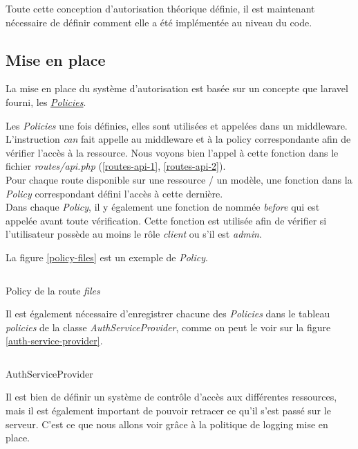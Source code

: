 \documentclass[
    iai, %
    il, %
]{heig-tb}
\begin{document}
Toute cette conception d'autorisation théorique définie, il est maintenant nécessaire de définir comment elle a été implémentée au niveau du code.

\subsection{Mise en place}
La mise en place du système d'autorisation est basée sur un concepte que \Gls{laravel} fourni, les \href{https://laravel.com/docs/9.x/authorization#creating-policies}{\emph{Policies}}.

Les \emph{Policies} une fois définies, elles sont utilisées et appelées dans un middleware. L'instruction \emph{can} fait appelle au middleware et à la policy correspondante afin de vérifier l'accès à la ressource. Nous voyons bien l'appel à cette fonction dans le fichier \emph{routes/api.php} (\ref{routes-api-1}, \ref{routes-api-2}). \\
Pour chaque route disponible sur une ressource / un modèle, une fonction dans la \emph{Policy} correspondant défini l'accès à cette dernière. \\
Dans chaque \emph{Policy}, il y également une fonction de nommée \emph{before} qui est appelée avant toute vérification. Cette fonction est utilisée afin de vérifier si l'utilisateur possède au moins le rôle \emph{client} ou s'il est \emph{admin}.

La figure \ref{policy-files} est un exemple de \emph{Policy}.

\begin{listing}[h]
    \inputminted{php}{assets/code/FilePolicy.php}
    \caption{Policy de la route \emph{files} \label{policy-files}}
\end{listing}

Il est également nécessaire d'enregistrer chacune des \emph{Policies} dans le tableau \emph{policies} de la classe \emph{AuthServiceProvider}, comme on peut le voir sur la figure \ref{auth-service-provider}.

\begin{listing}[h]
    \inputminted{php}{assets/code/FilePolicy.php}
    \caption{AuthServiceProvider \label{auth-service-provider}}
\end{listing}

Il est bien de définir un système de contrôle d'accès aux différentes ressources, mais il est également important de pouvoir retracer ce qu'il s'est passé sur le serveur. C'est ce que nous allons voir grâce à la politique de logging mise en place.
\end{document}
